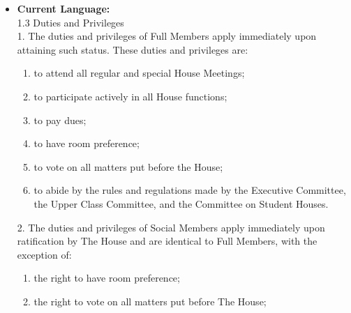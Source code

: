 \documentclass[10pt]{article} %
\begin{document}
\begin{itemize}
    
    \item \textbf{Current Language:} \\
        1.3 Duties and Privileges \\
        1. The duties and privileges of Full Members apply immediately upon attaining such status.
        These duties and privileges are:
        \begin{enumerate}[label=(\alph*)]
            \item to attend all regular and special House Meetings;
            \item to participate actively in all House functions;
            \item to pay dues;
            \item to have room preference;
            \item to vote on all matters put before the House;
            \item to abide by the rules and regulations made by the Executive Committee, the Upper Class Committee, and the Committee on Student Houses.
        \end{enumerate}
        2. The duties and privileges of Social Members apply immediately upon ratification by The House and are identical to Full Members, with the exception of:
        \begin{enumerate}[label=(\alph*)]
            \item the right to have room preference;
            \item the right to vote on all matters put before The House;
        \end{enumerate}

    \newpage


\end{itemize}
\end{document}

